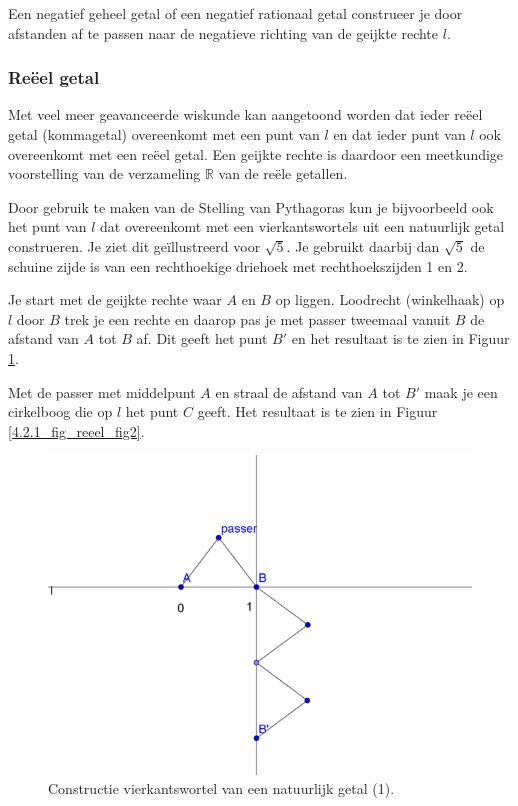 
Een negatief geheel getal of een negatief rationaal getal construeer je door afstanden af te passen naar de negatieve richting van de geijkte rechte $l$.

\subsubsection{Re\"eel getal}

Met veel meer geavanceerde wiskunde kan aangetoond worden dat ieder re\"eel getal (kommagetal) overeenkomt met een punt van $l$ en dat ieder punt van $l$ ook overeenkomt met een re\"eel getal. Een geijkte rechte is daardoor een meetkundige voorstelling van de verzameling $\mathbb{R}$ van de re\"ele getallen.\vspace{2mm}

Door gebruik te maken van de Stelling van Pythagoras kun je bijvoorbeeld ook het punt van $l$ dat overeenkomt met een vierkantswortels uit een natuurlijk getal construeren.
Je ziet dit ge\"illustreerd voor $\sqrt{5}$.
Je gebruikt daarbij dan $\sqrt{5}$ de schuine zijde is van een rechthoekige driehoek met rechthoekszijden 1 en 2.\vspace{5mm}

Je start met de geijkte rechte waar $A$ en $B$ op liggen.
Loodrecht (winkelhaak) op $l$ door $B$ trek je een rechte en daarop pas je met passer tweemaal vanuit $B$ de afstand van $A$ tot $B$ af.
Dit geeft het punt $B'$ en het resultaat is te zien in Figuur \ref{4.2.1_fig_reeel_fig1}.

Met de passer met middelpunt $A$ en straal de afstand van $A$ tot $B'$ maak je een cirkelboog die op $l$ het punt $C$ geeft.
Het resultaat is te zien in Figuur \ref{4.2.1_fig_reeel_fig2}.

\begin{figure}[h]
\begin{center}
\includegraphics[width=.5\linewidth]{4_opp_inhoud_an_meetk/inputs/AMTekst1Fig7}
\caption{Constructie vierkantswortel van een natuurlijk getal (1).}
\label{4.2.1_fig_reeel_fig1}
\end{center}
\end{figure}

